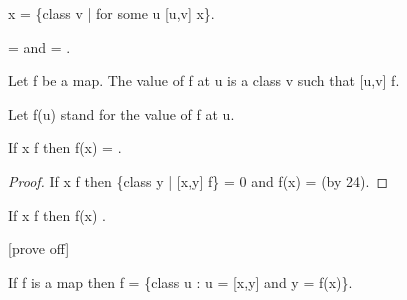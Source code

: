 \documentclass[a4paper,draft]{amsproc}
\begin{document}
\begin{forthel}
\begin{definition}[66]
\range x = \{class v | for some u [u,v] \in x\}.
\end{definition}

\begin{theorem}[67]
\domain {} =  and \range {} = .
\end{theorem}


\begin{signature}[68]
Let f be a map. %
The value of f at u is a class v such that [u,v] \in f.
\end{signature}
Let f(u) stand for the value of f at u.

\begin{theorem}[69a]
If x \notin \domain f then f(x) = .
\end{theorem}
\begin{proof}
If x \notin \domain f 
then \{class y | [x,y] \in f\} = 0 and f(x) =  (by 24).
\end{proof}

\begin{theorem}[69b]
If x \in \domain f then f(x) \in {}.
\end{theorem}

	[prove off]
\begin{theorem}[70]
If f is a map then f = \{class u : u = [x,y] and y = f(x)\}.
\end{theorem}


\end{forthel}
\end{document}
